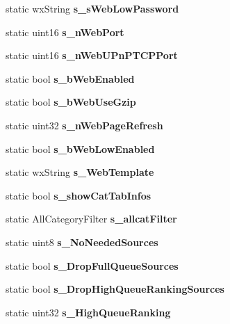 \begin{DoxyCompactItemize}
\item 
static wxString {\bfseries s\_\-sWebLowPassword}\label{classCPreferences_a70e298ffaed8ba91abf3dac32682cb5c}

\item 
static uint16 {\bfseries s\_\-nWebPort}\label{classCPreferences_ae3aed3ab18c2e2204077d4e249195e45}

\item 
static uint16 {\bfseries s\_\-nWebUPnPTCPPort}\label{classCPreferences_a446a9f28b646481951089688c14d2b1b}

\item 
static bool {\bfseries s\_\-bWebEnabled}\label{classCPreferences_ac590be0643c931d0ca02429655ee3d6c}

\item 
static bool {\bfseries s\_\-bWebUseGzip}\label{classCPreferences_aa638b3a10034f6c1cac04e46a48f47ee}

\item 
static uint32 {\bfseries s\_\-nWebPageRefresh}\label{classCPreferences_a80f6d8db312cb5d8089eed6a5a754931}

\item 
static bool {\bfseries s\_\-bWebLowEnabled}\label{classCPreferences_a1d40d9b566c47d4656e4097bda61e739}

\item 
static wxString {\bfseries s\_\-WebTemplate}\label{classCPreferences_a4628431aa844bcb34a44d7d15e7a542a}

\item 
static bool {\bfseries s\_\-showCatTabInfos}\label{classCPreferences_af68620714481fa1a2635c6ae25cbc38c}

\item 
static AllCategoryFilter {\bfseries s\_\-allcatFilter}\label{classCPreferences_af9853d69282e53865e9c2c784b59c64f}

\item 
static uint8 {\bfseries s\_\-NoNeededSources}\label{classCPreferences_a9b7963f2a7989913aa151ed351a6d4e8}

\item 
static bool {\bfseries s\_\-DropFullQueueSources}\label{classCPreferences_acbbfe8a829b9665ea61be56ac9a0abb7}

\item 
static bool {\bfseries s\_\-DropHighQueueRankingSources}\label{classCPreferences_a6ce5355bcf57ba9f51f34aff1be8f66a}

\item 
static uint32 {\bfseries s\_\-HighQueueRanking}\label{classCPreferences_a7d2a0c07c2aba26fdf83cb4aa57b87ef}


\end{DoxyCompactItemize}

